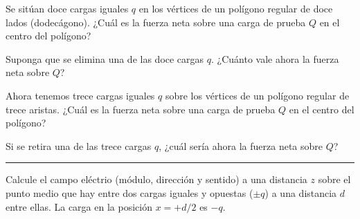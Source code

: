%
%
\setcounter{isubsheet}{1}


\begin{ejercicio}
% 
\item
\begin{subejercicio}
  \item  Se sitúan doce cargas iguales $q$ en los vértices de un polígono
    regular de doce lados (dodecágono).
    ¿Cuál es la fuerza neta sobre una carga de prueba $Q$ en el centro
    del polígono?
  \item Suponga que se elimina una de las doce cargas $q$.
    ¿Cuánto vale ahora la fuerza neta sobre $Q$?
  \item Ahora tenemos trece cargas iguales $q$ sobre los vértices de un
    polígono regular de trece aristas. ¿Cuál es la fuerza neta sobre una
    carga de prueba $Q$ en el centro del polígono?
  \item Si se retira una de las trece cargas $q$, ¿cuál sería ahora la
    fuerza neta sobre $Q$?
\end{subejercicio}

\medskip
{\color{gray}
\hrule
}

% 
\item
  \begin{subejercicio}
    Calcule el campo eléctrio (módulo, dirección y sentido) a una distancia
    $z$ sobre el punto medio que hay entre dos cargas iguales y opuestas
    ($\pm q$) a una distancia $d$ entre ellas. La carga en la posición
    $x= +d/2$ es $-q$.
\end{subejercicio}


\end{ejercicio}
